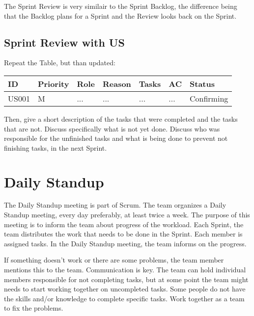 \documentclass[10pt]{report}
\begin{document}
The Sprint Review is very similair to the Sprint Backlog, the difference being that the Backlog plans for a Sprint and the Review looks back on the Sprint.

\subsection{Sprint Review with US}

Repeat the Table, but than updated: 

\medskip
\begin{tabularx}{0.8\textwidth} { 
  | >{\raggedright\arraybackslash}X 
  | >{\centering\arraybackslash}X 
  | >{\raggedright\arraybackslash}X 
  | >{\raggedright\arraybackslash}X 
  | >{\raggedright\arraybackslash}X 
  | >{\raggedright\arraybackslash}X 
  | >{\raggedleft\arraybackslash}X | }
 \hline
 ID & Priority & Role & Reason & Tasks & AC & Status \\
 \hline
 US001 & M & ... & ... & ... & ... & Confirming \\
 \hline
\end{tabularx}
\medskip

Then, give a short description of the tasks that were completed and the tasks that are not. Discuss specifically what is not yet done. Discuss who was responsible for the unfinished tasks and what is being done to prevent not finishing tasks, in the next Sprint.

\newpage

\section{Daily Standup}

The Daily Standup meeting is part of Scrum. The team organizes a Daily Standup meeting, every day preferably, at least twice a week. The purpose of this meeting is to inform the team about progress of the workload. Each Sprint, the team distributes the work that needs to be done in the Sprint. Each member is assigned tasks. In the Daily Standup meeting, the team informs on the progress.

If something doesn't work or there are some problems, the team member mentions this to the team. Communication is key. The team can hold individual members responsible for not completing tasks, but at some point the team might needs to start working together on uncompleted tasks. Some people do not have the skills and/or knowledge to complete specific tasks. Work together as a team to fix the problems.
\end{document}
